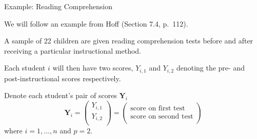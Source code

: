 \documentclass[ignorenonframetext,]{beamer}
\begin{document}
\begin{frame}{Example: Reading Comprehension}

We will follow an example from Hoff (Section 7.4, p.~112).

A sample of 22 children are given reading comprehension tests before and
after receiving a particular instructional method.

Each student \(i\) will then have two scores, \(Y_{i,1}\) and
\(Y_{i,2}\) denoting the pre- and post-instructional scores
respectively.

Denote each student's pair of scores \(\bm{Y}_i\) \[
\bm{Y}_{i} = \left( \begin{array}{c}
Y_{i,1}\\
Y_{i,2}\\
\end{array} \right) 
= \left( \begin{array}{c}
\text{score on first test}\\
\text{score on second test}\\
\end{array} \right)
\] where \(i=1,\ldots,n\) and \(p=2.\)

\end{frame}
\end{document}

